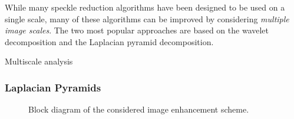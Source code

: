 While many speckle reduction algorithms have been designed to be used on a single scale, many of these algorithms can be improved by considering \textit{multiple image scales}.
The two most popular approaches are based on the wavelet decomposition and the Laplacian pyramid decomposition.

Multiscale analysis 

\subsubsection{Laplacian Pyramids}
%
\begin{figure}
  \centering
  \hspace{0.2in}
  \caption{Block diagram of the considered image enhancement scheme.}
\end{figure}

